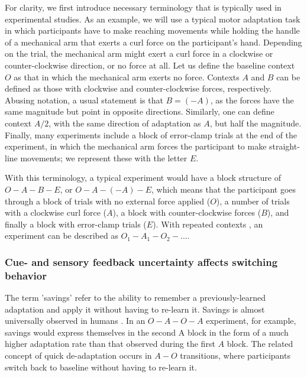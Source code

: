\documentclass[a4paper,doc,floatsintext,natbib]{apa6}
\begin{document}
For clarity, we first introduce necessary terminology that is typically used in experimental studies. As an example, we will use a typical motor adaptation task in which participants have to make reaching movements while holding the handle of a mechanical arm that exerts a curl force on the participant's hand. Depending on the trial, the mechanical arm might exert a curl force in a clockwise or counter-clockwise direction, or no force at all. Let us define the baseline context $O$ as that in which the mechanical arm exerts no force. Contexts $A$ and $B$ can be defined as those with clockwise and counter-clockwise forces, respectively. Abusing notation, a usual statement is that $B = (-A)$, as the forces have the same magnitude but point in opposite directions. Similarly, one can define context $A/2$, with the same direction of adaptation as $A$, but half the magnitude. Finally, many experiments include a block of error-clamp trials at the end of the experiment, in which the mechanical arm forces the participant to make straight-line movements; we represent these with the letter $E$.

With this terminology, a typical experiment \cite[e.g.][]{Ethier_Spontaneous_2008} would have a block structure of $O-A-B-E$, or $O-A-(-A)-E$, which means that the participant goes through a block of trials with no external force applied ($O$), a number of trials with a clockwise curl force ($A$), a block with counter-clockwise forces ($B$), and finally a block with error-clamp trials ($E$). With repeated contexts \citep[e.g.][]{Oh_Minimizing_2019}, an experiment can be described as $O_1-A_1-O_2-\ldots$.

\subsubsection{Cue- and sensory feedback uncertainty affects switching behavior}
The term 'savings' refer to the ability to remember a previously-learned adaptation and apply it without having to re-learn it. Savings is almost universally observed in humans \citep{Brashers-Krug_Consolidation_1996,Shadmehr_Functional_1997,Medina_Mechanism_2001,Smith_Interacting_2006,Zarahn_Explaining_2008}. In an $O-A-O-A$ experiment, for example, savings would express themselves in the second A block in the form of a much higher adaptation rate than that observed during the first $A$ block. The related concept of quick de-adaptation occurs in $A-O$ transitions, where participants switch back to baseline without having to re-learn it.
\end{document}

